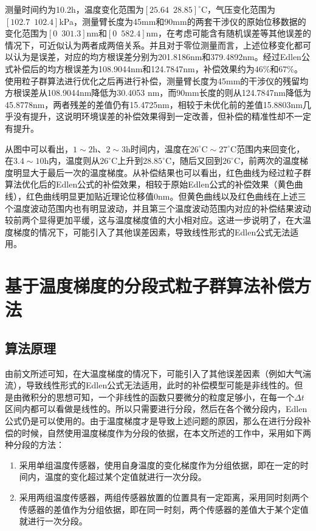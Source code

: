 测量时间约为10.2h，温度变化范围为$[25.64\,\,\,28.85]^{\circ} \mathrm{C}$，气压变化范围为$[102.7\,\,\,102.4]$kPa，测量臂长度为45mm和90mm的两套干涉仪的原始位移数据的变化范围为$[0 \,\,\, 301.3]$nm和$[0\,\,\,582.4]$nm，在考虑可能含有随机误差等其他误差的情况下，可近似认为两者成两倍关系。并且对于零位测量而言，上述位移变化都可以认为是误差，对应的均方根误差分别为201.8186nm和379.4892nm。经过Edlen公式补偿后的均方根误差为108.9044nm和124.7847nm，补偿效果约为$46\%$和$67\%$。使用粒子群算法进行优化之后再进行补偿，测量臂长度为45mm的干涉仪的残留均方根误差从108.9044nm降低为30.4053 nm，而90mm长度的则从124.7847nm降低为45.8778nm，两者残差的差值仍有15.4725nm，相较于未优化前的差值15.8803nm几乎没有提升，这说明环境误差的补偿效果得到一定改善，但补偿的精准性却不一定有提升。

从图中可以看出，$1\sim2$h、$2\sim3$h时间内，温度在$26^{\circ} \mathrm{C}\sim27^{\circ} \mathrm{C}$范围内来回变化，在$3.4\sim10$h内，温度则从$26^{\circ} \mathrm{C}$上升到$28.85^{\circ} \mathrm{C}$，随后又回到$26^{\circ} \mathrm{C}$，前两次的温度梯度明显大于最后一次的温度梯度。从补偿结果也可以看出，红色曲线为经过粒子群算法优化后的Edlen公式的补偿效果，相较于原始Edlen公式的补偿效果（黄色曲线），红色曲线明显更加贴近理论位移值0nm。但黄色曲线以及红色曲线在上述三个温度波动范围内也有明显波动，并且第三个温度波动范围内对应的补偿结果波动较前两个显得更加平缓，这与温度梯度值的大小相对应。这进一步说明了，在大温度梯度的情况下，可能引入了其他误差因素，导致线性形式的Edlen公式无法适用。

\section{基于温度梯度的分段式粒子群算法补偿方法}
\label{温度梯度的分段式粒子群算法补偿方法}
\subsection{算法原理}
由前文所述可知，在大温度梯度的情况下，可能引入了其他误差因素（例如大气湍流），导致线性形式的Edlen公式无法适用，此时的补偿模型可能是非线性的。但是由微积分的思想可知，一个非线性的函数只要微分的粒度足够小，在每一个$\Delta t$区间内都可以看做是线性的。所以只需要进行分段，然后在各个微分段内，Edlen公式仍是可以使用的。由于温度梯度才是导致上述问题的原因，那么在进行分段补偿的时候，自然使用温度梯度作为分段的依据，在本文所述的工作中，采用如下两种分段的方法：
\begin{enumerate}
  \item 采用单组温度传感器，使用自身温度的变化梯度作为分组依据，即在一定的时间内，温度的变化超过某个定值就进行一次分段。
  \item 采用两组温度传感器，两组传感器放置的位置具有一定距离，采用同时刻两个传感器的差值作为分组依据，即在同一时刻，两个传感器的差值大于某个定值就进行一次分段。
\end{enumerate}

